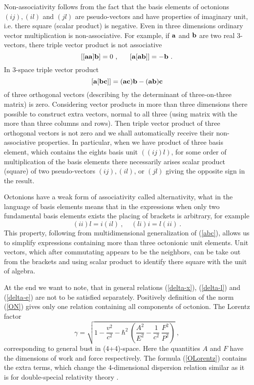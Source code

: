 \documentclass[a4paper,12pt]{article}
\begin{document}
Non-associativity follows from the fact that the basis elements of octonions $(ij), (il)$ 
and $(jl)$ are pseudo-vectors and have properties of imaginary unit, i.e. there square 
(scalar product) is negative. Even in three dimensions ordinary vector multiplication is 
non-associative. For example, if ${\bf a}$ and ${\bf b}$ are two real 3-vectors, there 
triple vector product is not associative 
\begin{equation} \label{non-ass}
[[{\bf aa}]{\bf b}] = 0 ~, ~~~~~ [{\bf a}[{\bf ab}]]=-{\bf b} ~.
\end{equation}
In 3-space triple vector product 
\begin{equation} \label{abc}
[{\bf a}[{\bf bc}]] = ({\bf ac}){\bf b} - ({\bf ab}){\bf c}
\end{equation}
of three orthogonal vectors (describing by the determinant of three-on-three matrix) is 
zero. Considering vector products in more than three dimensions there possible to 
construct extra vectors, normal to all three (using matrix with the more than three 
columns and rows). Then triple vector product of three orthogonal vectors is not zero 
and we shall automatically receive their non-associative properties. In particular, when 
we have product of three basis element, which contains the eights basis unit $((ij)l)$, 
for some order of multiplication of the basis elements there necessarily arises scalar 
product (square) of two pseudo-vectors $(ij), (il)$, or $(jl)$ giving the opposite sign 
in the result. 

Octonions have a weak form of associativity called alternativity, what in the language 
of basis elements means that in the expressions when only two fundamental basis elements 
exists the placing of brackets is arbitrary, for example 
\begin{equation} \label{ii}
(ii)l = i(il)~, ~~~~~ (li)i = l(ii) ~.
\end{equation}
This property, following from multidimensional generalization of (\ref{abc}), allows us 
to simplify expressions containing more than three octonionic unit elements. Unit 
vectors, which after commutating appears to be the neighbors, can be take out from the 
brackets and using scalar product to identify there square with the unit of algebra. 

At the end we want to note, that in general relations (\ref{delta-x}), (\ref{delta-l}) 
and (\ref{delta-e}) are not to be satisfied separately. Positively definition of the 
norm (\ref{ON}) gives only one relation containing all components of octonion. The 
Lorentz factor 
\begin{equation} \label{OLorentz}
\gamma = \sqrt{1 - \frac{v^2}{c^2}  - \hbar^2 ~\left(\frac{A^2}{E^2} - \frac{1}{c^2}~ 
\frac{F^2}{P^2}\right) }~,
\end{equation}
corresponding to general bust in (4+4)-space. Here the quantities $A$ and $F$ have 
the dimensions of work and force respectively. The formula (\ref{OLorentz}) contains 
the extra terms, which change the 4-dimensional dispersion relation similar as it is 
for double-special relativity theory \cite{double}. 
\end{document}

